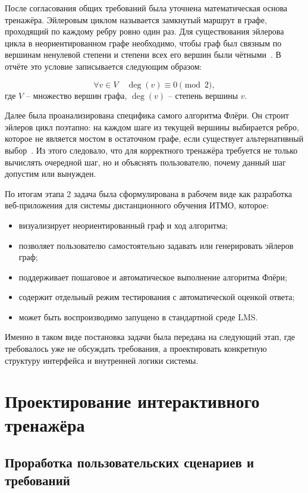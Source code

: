 \documentclass[a4paper,12pt]{extarticle}
\begin{document}
После согласования общих требований была уточнена математическая основа тренажёра. Эйлеровым циклом называется замкнутый маршрут в графе, проходящий по каждому ребру ровно один раз. Для существования эйлерова цикла в неориентированном графе необходимо, чтобы граф был связным по вершинам ненулевой степени и степени всех его вершин были чётными~\cite{bondy2008,harary1969}. В отчёте это условие записывается следующим образом:

\begin{equation}
\forall v \in V \quad \deg(v) \equiv 0 \pmod{2},
\label{eq:euler}
\end{equation}
где $V$ -- множество вершин графа, $\deg(v)$ -- степень вершины $v$.

Далее была проанализирована специфика самого алгоритма Флёри. Он строит эйлеров цикл поэтапно: на каждом шаге из текущей вершины выбирается ребро, которое не является мостом в остаточном графе, если существует альтернативный выбор~\cite{wilson2010,west2001}. Из этого следовало, что для корректного тренажёра требуется не только вычислять очередной шаг, но и объяснять пользователю, почему данный шаг допустим или вынужден.

По итогам этапа 2 задача была сформулирована в рабочем виде как разработка веб-приложения для системы дистанционного обучения ИТМО, которое:
\begin{itemize}
  \item визуализирует неориентированный граф и ход алгоритма;
  \item позволяет пользователю самостоятельно задавать или генерировать эйлеров граф;
  \item поддерживает пошаговое и автоматическое выполнение алгоритма Флёри;
  \item содержит отдельный режим тестирования с автоматической оценкой ответа;
  \item может быть воспроизводимо запущено в стандартной среде LMS.
\end{itemize}

Именно в таком виде постановка задачи была передана на следующий этап, где требовалось уже не обсуждать требования, а проектировать конкретную структуру интерфейса и внутренней логики системы.

\section{Проектирование интерактивного тренажёра}

\subsection{Проработка пользовательских сценариев и требований}
\end{document}
